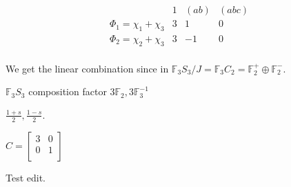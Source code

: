 \documentclass{article}
\theoremstyle{definition}
\begin{document}
\[
    \begin{array}{cccc}
         & 1 & (ab) & (abc)\\
    \Phi_1=\chi_1 + \chi_3 & 3 & 1 & 0 \\
    \Phi_2=\chi_2 + \chi_3 & 3 & -1 & 0 \\
    
    \end{array}
\]

We get the linear combination since in \(\mathbb{F}_3 S_3 / J =\mathbb{F} _3 C_2 = \mathbb{F}_2^+ \oplus \mathbb{F}_2^-\).


\(\mathbb{F}_3 S_3\) composition factor \(3 \mathbb{F}_2, 3 \mathbb{F}_3^{-1}\)

\(\frac{1+s}{2}, \frac{1-s}{2}\).

\(C = \begin{bmatrix}
    3 & 0\\
    0 & 1\\
\end{bmatrix}\) 

Test edit.
\end{document}
